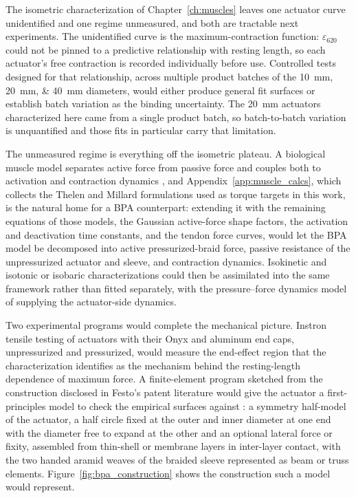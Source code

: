 The isometric characterization of Chapter~\ref{ch:muscles} leaves one actuator curve unidentified and one regime unmeasured, and both are tractable next experiments. The unidentified curve is the maximum-contraction function: $\varepsilon_{620}$ could not be pinned to a predictive relationship with resting length, so each actuator's free contraction is recorded individually before use. Controlled tests designed for that relationship, across multiple product batches of the \qtylist{10;20;40}{\mm} diameters, would either produce general fit surfaces or establish batch variation as the binding uncertainty. The \qty{20}{\mm} actuators characterized here came from a single product batch, so batch-to-batch variation is unquantified and those fits in particular carry that limitation.

The unmeasured regime is everything off the isometric plateau. A biological muscle model separates active force from passive force and couples both to activation and contraction dynamics \citep{thelen_adjustment_2003, millard_flexing_2013}, and Appendix~\ref{app:muscle_calcs}, which collects the Thelen and Millard formulations used as torque targets in this work, is the natural home for a BPA counterpart: extending it with the remaining equations of those models, the Gaussian active-force shape factors, the activation and deactivation time constants, and the tendon force curves, would let the BPA model be decomposed into active pressurized-braid force, passive resistance of the unpressurized actuator and sleeve, and contraction dynamics. Isokinetic and isotonic or isobaric characterizations could then be assimilated into the same framework rather than fitted separately, with the pressure--force dynamics model of \citet{elzein_pressure_2025} supplying the actuator-side dynamics.

Two experimental programs would complete the mechanical picture. Instron tensile testing of actuators with their Onyx and aluminum end caps, unpressurized and pressurized, would measure the end-effect region that the characterization identifies as the mechanism behind the resting-length dependence of maximum force. A finite-element program sketched from the construction disclosed in Festo's patent literature would give the actuator a first-principles model to check the empirical surfaces against \citep{festo_2026}: a symmetry half-model of the actuator, a half circle fixed at the outer and inner diameter at one end with the diameter free to expand at the other and an optional lateral force or fixity, assembled from thin-shell or membrane layers in inter-layer contact, with the two handed aramid weaves of the braided sleeve represented as beam or truss elements. Figure~\ref{fig:bpa_construction} shows the construction such a model would represent.

